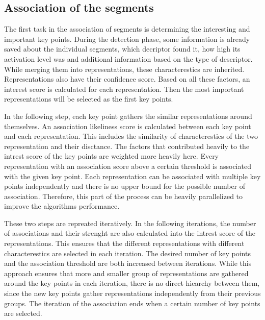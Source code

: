 \subsection{Association of the segments} %

The first task in the association of segments is determining the interesting and important key points. During the detection phase, some information is already saved about the individual segments, which decriptor found it, how high its activation level was and additional information based on the type of descriptor. While merging them into representations, these characterestics are inherited. Representations also have their confidence score. Based on all these factors, an interest score is calculated for each representation. Then the most important representations will be selected as the first key points.

In the following step, each key point gathers the similar representations around themselves. An association likeliness score is calculated between each key point and each representation. This includes the similarity of characterestics of the two representation and their disctance. The factors that contributed heavily to the intrest score of the key points are weighted more heavily here. Every representation with an association score above a certain threshold is associated with the given key point. Each representation can be associated with multiple key points independently and there is no upper bound for the possible number of association. Therefore, this part of the process can be heavily parallelized to improve the algorithms performance.

These two steps are repreated iteratively. In the following iterations, the number of associations and their strenght are also calculated into the intrest score of the representations. This ensures that the different representations with different characterestics are selected in each iteration. The desired number of key points and the association threshold are both increased between iterations. While this approach ensures that more and smaller group of representations are gathered around the key points in each iteration, there is no direct hiearchy between them, since the new key points gather representations independently from their previous groups. The iteration of the association ends when a certain number of key points are selected.

